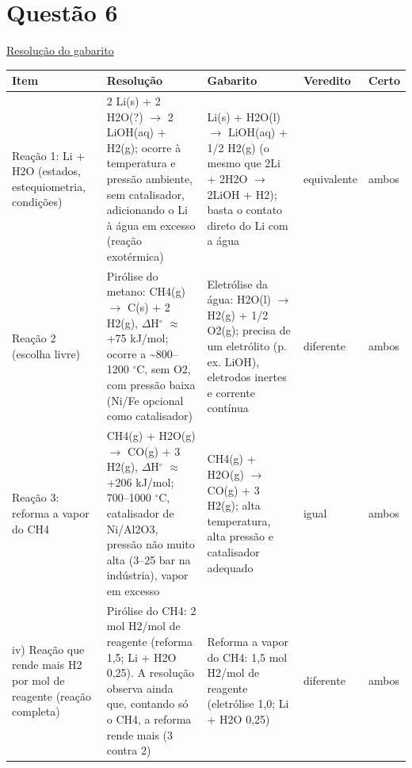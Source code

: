 \documentclass{article}%
\begin{document}
\section*{Questão 6}%
\href{https://poliedroresolve.sistemapoliedro.com.br/vestibulares/ita/2027/ita-2-fase-dia-2-21-10-2026-2-fase-dia-2/dissertativa-6-quimica-2-fase-dia-2-ita-2027}{Resolução do gabarito}\par\smallskip%
\begin{longtable}{@{}p{} p{} p{} p{} p{}@{}}\toprule Item & Resolução & Gabarito & Veredito & Certo \\ \midrule
Reação 1: Li + H2O (estados, estequiometria, condições) & 2 Li(s) + 2 H2O(?) $\to$ 2 LiOH(aq) + H2(g); ocorre à temperatura e pressão ambiente, sem catalisador, adicionando o Li à água em excesso (reação exotérmica) & Li(s) + H2O(l) $\to$ LiOH(aq) + 1/2 H2(g) (o mesmo que 2Li + 2H2O $\to$ 2LiOH + H2); basta o contato direto do Li com a água & equivalente & ambos \\
Reação 2 (escolha livre) & Pirólise do metano: CH4(g) $\to$ C(s) + 2 H2(g), $\Delta$H$^\circ$ $\approx$ +75 kJ/mol; ocorre a \textasciitilde{}800--1200 $^\circ$C, sem O2, com pressão baixa (Ni/Fe opcional como catalisador) & Eletrólise da água: H2O(l) $\to$ H2(g) + 1/2 O2(g); precisa de um eletrólito (p. ex. LiOH), eletrodos inertes e corrente contínua & diferente & ambos \\
Reação 3: reforma a vapor do CH4 & CH4(g) + H2O(g) $\to$ CO(g) + 3 H2(g), $\Delta$H$^\circ$ $\approx$ +206 kJ/mol; 700--1000 $^\circ$C, catalisador de Ni/Al2O3, pressão não muito alta (3--25 bar na indústria), vapor em excesso & CH4(g) + H2O(g) $\to$ CO(g) + 3 H2(g); alta temperatura, alta pressão e catalisador adequado & igual & ambos \\
iv) Reação que rende mais H2 por mol de reagente (reação completa) & Pirólise do CH4: 2 mol H2/mol de reagente (reforma 1,5; Li + H2O 0,25). A resolução observa ainda que, contando só o CH4, a reforma rende mais (3 contra 2) & Reforma a vapor do CH4: 1,5 mol H2/mol de reagente (eletrólise 1,0; Li + H2O 0,25) & diferente & ambos \\
\bottomrule\end{longtable}%
\end{document}
